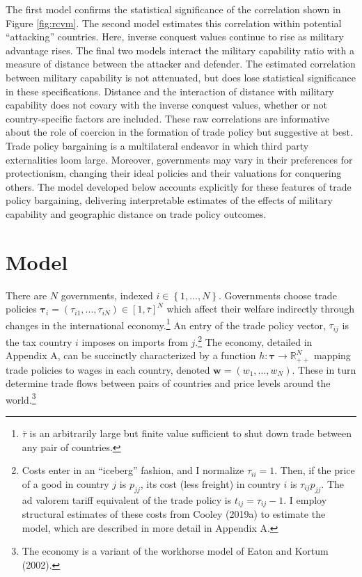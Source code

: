 \documentclass{puthesis}
\begin{document}
The first model confirms the statistical significance of the correlation
shown in Figure \ref{fig:rcvm}. The second model estimates this
correlation within potential ``attacking'' countries. Here, inverse
conquest values continue to rise as military advantage rises. The final
two models interact the military capability ratio with a measure of
distance between the attacker and defender. The estimated correlation
between military capability is not attenuated, but does lose statistical
significance in these specifications. Distance and the interaction of
distance with military capability does not covary with the inverse
conquest values, whether or not country-specific factors are included.
These raw correlations are informative about the role of coercion in the
formation of trade policy but suggestive at best. Trade policy
bargaining is a multilateral endeavor in which third party externalities
loom large. Moreover, governments may vary in their preferences for
protectionism, changing their ideal policies and their valuations for
conquering others. The model developed below accounts explicitly for
these features of trade policy bargaining, delivering interpretable
estimates of the effects of military capability and geographic distance
on trade policy outcomes.

\section{Model}

There are \(N\) governments, indexed
\(i \in \left\{ 1, ..., N \right\}\). Governments choose trade policies
\(\bm{\tau}_i = \left( \tau_{i1}, ..., \tau_{iN} \right) \in [1, \bar{\tau}]^N\)
which affect their welfare indirectly through changes in the
international economy.\footnote{\(\bar{\tau}\) is an arbitrarily large
  but finite value sufficient to shut down trade between any pair of
  countries.} An entry of the trade policy vector, \(\tau_{ij}\) is the
tax country \(i\) imposes on imports from \(j\).\footnote{Costs enter in
  an ``iceberg'' fashion, and I normalize \(\tau_{ii} = 1\). Then, if
  the price of a good in country \(j\) is \(p_{jj}\), its cost (less
  freight) in country \(i\) is \(\tau_{ij} p_{jj}\). The ad valorem
  tariff equivalent of the trade policy is \(t_{ij} = \tau_{ij} - 1\). I
  employ structural estimates of these costs from Cooley (2019a) to
  estimate the model, which are described in more detail in Appendix A.}
The economy, detailed in Appendix A, can be succinctly characterized by
a function \(h: \bm{\tau} \rightarrow \mathbb{R}_{++}^N\) mapping trade
policies to wages in each country, denoted
\(\bm{w} = \left( w_1, ..., w_N \right)\). These in turn determine trade
flows between pairs of countries and price levels around the
world.\footnote{The economy is a variant of the workhorse model of Eaton
  and Kortum (2002).}
\end{document}
